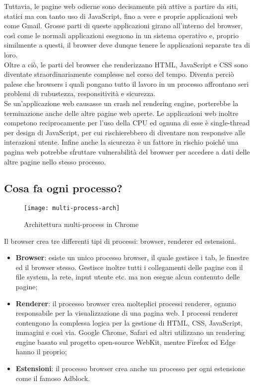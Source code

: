 Tuttavia, le pagine web odierne sono decisamente più attive a partire da siti, statici ma con tanto uso di JavaScript, fino a vere e proprie applicazioni web come Gmail. Grosse parti di queste applicazioni girano all'interno del browser, così come le normali applicazioni eseguono in un sistema operativo e, proprio similmente a questi, il browser deve dunque tenere le applicazioni separate tra di loro. \\

Oltre a ciò, le parti del browser che renderizzano HTML, JavaScript e CSS sono diventate straordinariamente complesse nel corso del tempo. Diventa perciò palese che browsers i quali pongano tutto il lavoro in un processo affrontano seri problemi di rubustezza, responsitività e sicurezza. \\

Se un'applicazione web causasse un crash nel rendering engine, porterebbe la terminazione anche delle altre pagine web aperte. Le applicazioni web inoltre competono reciprocamente per l'uso della CPU ed ognuna di esse è single-thread per design di JavaScript, per cui rischierebbero di diventare non responsive alle interazioni utente. Infine anche la sicurezza è un fattore in rischio poiché una pagina web potrebbe sfruttare vulnerabilità del browser per accedere a dati delle altre pagine nello stesso processo.

\subsection{Cosa fa ogni processo?}

\begin{figure}[H] 
    \centering 
    \texttt{[image: multi-process-arch]} 
    \caption{Architettura multi-process in Chrome}
\end{figure}

Il browser crea tre differenti tipi di processi: browser, renderer ed estensioni.

\begin{itemize}
    \item \textbf{Browser}: esiste un unico processo browser, il quale gestisce i tab, le finestre ed il browser stesso. Gestisce inoltre tutti i collegamenti delle pagine con il file system, la rete, input utente etc. ma non esegue alcun contenuto delle pagine;
    \item \textbf{Renderer}: il processo browser crea molteplici processi renderer, ognuno responsabile per la visualizzazione di una pagina web. I processi renderer contengono la complessa logica per la gestione di HTML, CSS, JavaScript, immagini e così via. Google Chrome, Safari ed altri utilizzano un rendering engine basato sul progetto open-source WebKit, mentre Firefox ed Edge hanno il proprio;
    \item \textbf{Estensioni}: il processo browser crea anche un processo per ogni estensione come il famoso Adblock.
\end{itemize}

